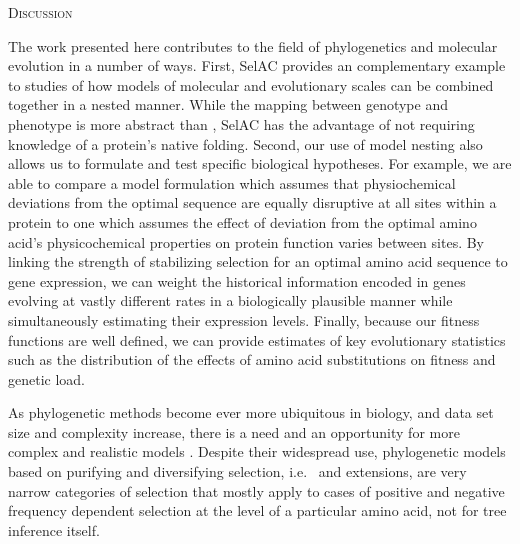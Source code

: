 \documentclass[12pt,letterpaper]{article}
\renewcommand{\section}[1]{%
\bigskip
\begin{center}
\begin{Large}
\normalfont\scshape #1
\medskip
\end{Large}
\end{center}}
\newcommand{\selac}{SelAC\xspace}
\begin{document}
\section{Discussion}
The work presented here contributes to the field of phylogenetics and molecular evolution in a number of ways.
First, \selac provides an complementary example to \citet{ThorneEtAl2012} studies of how models of molecular and evolutionary scales can be combined together in a nested manner.
While the mapping between genotype and phenotype is more abstract than \citet{ThorneEtAl2012}, \selac has the advantage of not requiring knowledge of a protein's native folding.
Second, our use of model nesting also allows us to formulate and test specific biological hypotheses.
For example, we are able to compare a model formulation which assumes that physiochemical deviations from the optimal sequence are equally disruptive at all sites within a protein to one which assumes the effect of deviation from the optimal amino acid's physicochemical properties on protein function varies between sites.
By linking the strength of stabilizing selection for an optimal amino acid sequence to gene expression, we can weight the historical information encoded in genes evolving at vastly different rates in a biologically plausible manner while simultaneously estimating their expression levels.
Finally, because our fitness functions are well defined, we can provide estimates of key evolutionary statistics such as the distribution of the effects of amino acid substitutions on fitness and genetic load.

As phylogenetic methods become ever more ubiquitous in biology, and data set size and complexity increase, there is a need and an opportunity for more complex and realistic models \citep{GoldmanEtAl1996,ThorneEtAl1996,GoldmanEtAl1998,HalpernAndBruno1998,LartillotAndPhilippe2004}.
Despite their widespread use, phylogenetic models based on purifying and diversifying selection, i.e.~\citet{GoldmanAndYang1994} and extensions, are very narrow categories of selection that mostly apply to cases of positive and negative frequency dependent selection at the level of a particular amino acid, not for tree inference itself.
\end{document}
